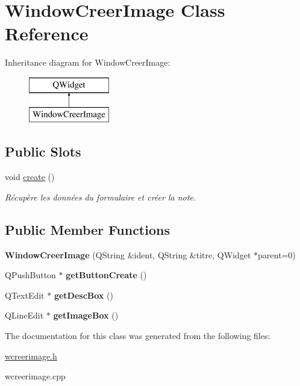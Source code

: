 \hypertarget{class_window_creer_image}{}\section{Window\+Creer\+Image Class Reference}
\label{class_window_creer_image}
Inheritance diagram for Window\+Creer\+Image\+:\begin{figure}[H]
\begin{center}
\leavevmode
\includegraphics[height=2.000000cm]{class_window_creer_image}
\end{center}
\end{figure}
\subsection*{Public Slots}
\begin{DoxyCompactItemize}
\item 
\mbox{\label{class_window_creer_image_a021cfe549b03de190478c16f0a1b07c2}} 
void \hyperlink{class_window_creer_image_a021cfe549b03de190478c16f0a1b07c2}{create} ()
\begin{DoxyCompactList}\small\item\em Récupère les données du formulaire et créer la note. \end{DoxyCompactList}\end{DoxyCompactItemize}
\subsection*{Public Member Functions}
\begin{DoxyCompactItemize}
\item 
\mbox{\label{class_window_creer_image_a2cd80bac4f212bc2abf3dd3b3fdaeb59}} 
{\bfseries Window\+Creer\+Image} (Q\+String \&ident, Q\+String \&titre, Q\+Widget $\ast$parent=0)
\item 
\mbox{\label{class_window_creer_image_aa32a8e392e9c16ec9a634591c87755c4}} 
Q\+Push\+Button $\ast$ {\bfseries get\+Button\+Create} ()
\item 
\mbox{\label{class_window_creer_image_ad8312e6c9a723333399b0cffc2b308f6}} 
Q\+Text\+Edit $\ast$ {\bfseries get\+Desc\+Box} ()
\item 
\mbox{\label{class_window_creer_image_a123decae461db49f5542b6229205e2a2}} 
Q\+Line\+Edit $\ast$ {\bfseries get\+Image\+Box} ()
\end{DoxyCompactItemize}


The documentation for this class was generated from the following files\+:\begin{DoxyCompactItemize}
\item 
\hyperlink{wcreerimage_8h}{wcreerimage.\+h}\item 
wcreerimage.\+cpp\end{DoxyCompactItemize}
